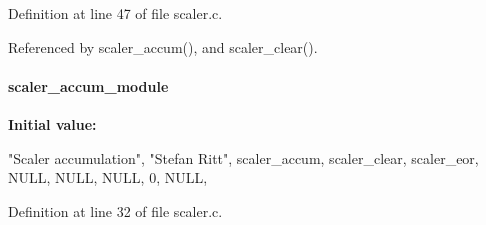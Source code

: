Definition at line 47 of file scaler.c.

Referenced by scaler\_\-accum(), and scaler\_\-clear().
\paragraph[{scaler\_\-accum\_\-module}]{ {\bf scaler\_\-accum\_\-module}}\hfill\label{scaler_8c_a4c8b24b6a38f43da323289e5241002d6}
{\bfseries Initial value:}
\begin{DoxyCode}
 {
   "Scaler accumulation",       
   "Stefan Ritt",               
   scaler_accum,                
   scaler_clear,                
   scaler_eor,                  
   NULL,                        
   NULL,                        
   NULL,                        
   0,                           
   NULL,                        
}
\end{DoxyCode}


Definition at line 32 of file scaler.c.